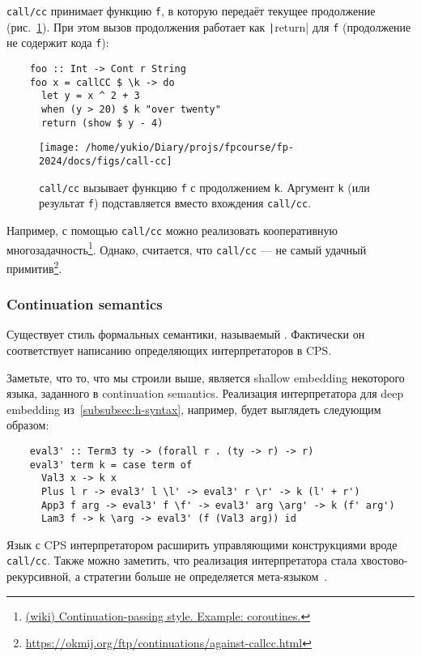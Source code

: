 \texttt{call/cc} принимает функцию \texttt{f}, в которую передаёт текущее продолжение (рис.~\ref{fig:call-cc}).
При этом вызов продолжения работает как \texttt|return| для \texttt{f} (продолжение не содержит кода \texttt{f}):
\begin{verbatim}
    foo :: Int -> Cont r String
    foo x = callCC $ \k -> do
      let y = x ^ 2 + 3
      when (y > 20) $ k "over twenty"
      return (show $ y - 4)
\end{verbatim}

\begin{figure}
    \centering
    \texttt{[image: /home/yukio/Diary/projs/fpcourse/fp-2024/docs/figs/call-cc]}
    \caption{\texttt{call/cc} вызывает функцию \texttt{f} с продолжением \texttt{k}.
    Аргумент \texttt{k} (или результат \texttt{f}) подставляется вместо вхождения \texttt{call/cc}.}
    \label{fig:call-cc}
\end{figure}

Например, с помощью \texttt{call/cc} можно реализовать кооперативную многозадачность\footnote{\href{https://en.wikibooks.org/wiki/Haskell/Continuation_passing_style\#Example:_coroutines}{(wiki) Continuation-passing style.
Example: coroutines.}}.
Однако, считается, что \texttt{call/cc} --- не самый удачный примитив\footnote{\url{https://okmij.org/ftp/continuations/against-callcc.html}}.

\subsubsection{Continuation semantics}

Существует стиль формальных семантики, называемый .
Фактически он соответствует написанию определяющих интерпретаторов в CPS.

Заметьте, что то, что мы строили выше, является shallow embedding некоторого языка, заданного в continuation semantics.
Реализация интерпретатора для deep embedding из~\ref{subsubsec:h-syntax}, например, будет выглядеть следующим образом:
\begin{verbatim}
    eval3' :: Term3 ty -> (forall r . (ty -> r) -> r)
    eval3' term k = case term of
      Val3 x -> k x
      Plus l r -> eval3' l \l' -> eval3' r \r' -> k (l' + r')
      App3 f arg -> eval3' f \f' -> eval3' arg \arg' -> k (f' arg')
      Lam3 f -> k \arg -> eval3' (f (Val3 arg)) id
\end{verbatim}

Язык с CPS интерпретатором расширить управляющими конструкциями вроде \texttt{call/cc}.
Также можно заметить, что реализация интерпретатора стала хвостово-рекурсивной, а стратегии больше не определяется мета-языком~\cite{reynolds1972definitional}.


